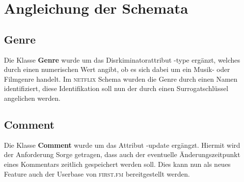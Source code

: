 \documentclass[11pt,a4paper,DIV=9]{scrartcl}
\begin{document}

\section{Angleichung der Schemata}
  \subsection{Genre} 
    Die Klasse \textbf{Genre} wurde um das Disrkiminatorattribut -type ergänzt, welches durch einen numerischen Wert angibt, ob es sich dabei um ein Musik- oder Filmgenre handelt. Im \textsc{netflix} Schema wurden die Genre durch einen Namen identifiziert, diese Identifikation soll nun der durch einen Surrogatschlüssel angelichen werden.
  \subsection{Comment}
    Die Klasse \textbf{Comment} wurde um das Attribut -update ergängzt. Hiermit wird der Anforderung Sorge getragen, dass auch der eventuelle Änderungszeitpunkt eines Kommentars zeitlich gespeichert werden soll. Dies kann nun als neues Feature auch der Userbase von \textsc{first.fm} bereitgestellt werden.
    
\end{document}
